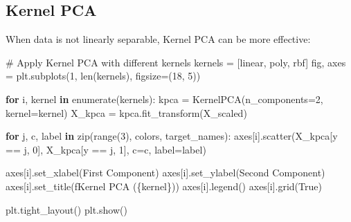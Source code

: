 \documentclass[
  letterpaper,
  DIV=11,
  numbers=noendperiod]{scrreprt}
\newenvironment{Shaded}{\begin{snugshade}}{\end{snugshade}}
\newcommand{\BuiltInTok}[1]{\textcolor[rgb]{0.00,0.23,0.31}{#1}}
\newcommand{\CommentTok}[1]{\textcolor[rgb]{0.37,0.37,0.37}{#1}}
\newcommand{\ControlFlowTok}[1]{\textcolor[rgb]{0.00,0.23,0.31}{\textbf{#1}}}
\newcommand{\DecValTok}[1]{\textcolor[rgb]{0.68,0.00,0.00}{#1}}
\newcommand{\KeywordTok}[1]{\textcolor[rgb]{0.00,0.23,0.31}{\textbf{#1}}}
\newcommand{\NormalTok}[1]{\textcolor[rgb]{0.00,0.23,0.31}{#1}}
\newcommand{\OperatorTok}[1]{\textcolor[rgb]{0.37,0.37,0.37}{#1}}
\newcommand{\SpecialCharTok}[1]{\textcolor[rgb]{0.37,0.37,0.37}{#1}}
\newcommand{\SpecialStringTok}[1]{\textcolor[rgb]{0.13,0.47,0.30}{#1}}
\newcommand{\StringTok}[1]{\textcolor[rgb]{0.13,0.47,0.30}{#1}}
\newcommand{\VariableTok}[1]{\textcolor[rgb]{0.07,0.07,0.07}{#1}}
\begin{document}
\subsection{Kernel PCA}\label{kernel-pca}

When data is not linearly separable, Kernel PCA can be more effective:

\begin{Shaded}
\begin{Highlighting}[]
\CommentTok{\# Apply Kernel PCA with different kernels}
\NormalTok{kernels }\OperatorTok{=}\NormalTok{ [}\StringTok{\textquotesingle{}linear\textquotesingle{}}\NormalTok{, }\StringTok{\textquotesingle{}poly\textquotesingle{}}\NormalTok{, }\StringTok{\textquotesingle{}rbf\textquotesingle{}}\NormalTok{]}
\NormalTok{fig, axes }\OperatorTok{=}\NormalTok{ plt.subplots(}\DecValTok{1}\NormalTok{, }\BuiltInTok{len}\NormalTok{(kernels), figsize}\OperatorTok{=}\NormalTok{(}\DecValTok{18}\NormalTok{, }\DecValTok{5}\NormalTok{))}

\ControlFlowTok{for}\NormalTok{ i, kernel }\KeywordTok{in} \BuiltInTok{enumerate}\NormalTok{(kernels):}
\NormalTok{    kpca }\OperatorTok{=}\NormalTok{ KernelPCA(n\_components}\OperatorTok{=}\DecValTok{2}\NormalTok{, kernel}\OperatorTok{=}\NormalTok{kernel)}
\NormalTok{    X\_kpca }\OperatorTok{=}\NormalTok{ kpca.fit\_transform(X\_scaled)}
    
    \ControlFlowTok{for}\NormalTok{ j, c, label }\KeywordTok{in} \BuiltInTok{zip}\NormalTok{(}\BuiltInTok{range}\NormalTok{(}\DecValTok{3}\NormalTok{), colors, target\_names):}
\NormalTok{        axes[i].scatter(X\_kpca[y }\OperatorTok{==}\NormalTok{ j, }\DecValTok{0}\NormalTok{], X\_kpca[y }\OperatorTok{==}\NormalTok{ j, }\DecValTok{1}\NormalTok{], c}\OperatorTok{=}\NormalTok{c, label}\OperatorTok{=}\NormalTok{label)}
    
\NormalTok{    axes[i].set\_xlabel(}\StringTok{\textquotesingle{}First Component\textquotesingle{}}\NormalTok{)}
\NormalTok{    axes[i].set\_ylabel(}\StringTok{\textquotesingle{}Second Component\textquotesingle{}}\NormalTok{)}
\NormalTok{    axes[i].set\_title(}\SpecialStringTok{f\textquotesingle{}Kernel PCA (}\SpecialCharTok{\{}\NormalTok{kernel}\SpecialCharTok{\}}\SpecialStringTok{)\textquotesingle{}}\NormalTok{)}
\NormalTok{    axes[i].legend()}
\NormalTok{    axes[i].grid(}\VariableTok{True}\NormalTok{)}

\NormalTok{plt.tight\_layout()}
\NormalTok{plt.show()}
\end{Highlighting}
\end{Shaded}
\end{document}
